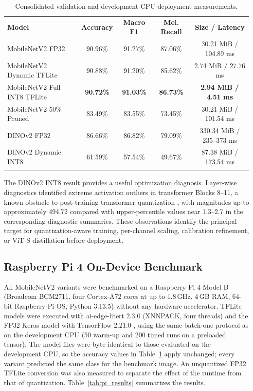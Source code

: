 \documentclass[3p,times,procedia]{elsarticle}
\begin{document}
\begin{table}[htbp]
\centering
\caption{Consolidated validation and development-CPU deployment measurements.}
\label{tab:compression_results}
\begin{tabular*}{\hsize}{@{\extracolsep{\fill}}lcccc}
\toprule
\textbf{Model} & \textbf{Accuracy} & \textbf{Macro F1} & \textbf{Mel. Recall} & \textbf{Size / Latency} \\
\colrule
MobileNetV2 FP32 & 90.96\% & 91.27\% & 87.06\% & 30.21 MiB / 104.89 ms \\
MobileNetV2 Dynamic TFLite & 90.88\% & 91.20\% & 85.62\% & 2.74 MiB / 27.76 ms \\
MobileNetV2 Full INT8 TFLite & \textbf{90.72\%} & \textbf{91.03\%} & \textbf{86.73\%} & \textbf{2.94 MiB / 4.51 ms} \\
MobileNetV2 50\% Pruned & 83.49\% & 83.55\% & 73.45\% & 30.21 MiB / 101.54 ms \\
DINOv2 FP32 & 86.66\% & 86.82\% & 79.09\% & 330.34 MiB / 235--373 ms \\
DINOv2 Dynamic INT8 & 61.59\% & 57.54\% & 49.67\% & 87.38 MiB / 173.54 ms \\
\botrule
\end{tabular*}
\end{table}

The DINOv2 INT8 result provides a useful optimization diagnosis. Layer-wise diagnostics identified extreme activation outliers in transformer Blocks 8--11, a known obstacle to post-training transformer quantization \cite{bondarenko2021,dettmers2022}, with magnitudes up to approximately 494.72 compared with upper-percentile values near 1.3--2.7 in the corresponding diagnostic summaries. These observations identify the principal target for quantization-aware training, per-channel scaling, calibration refinement, or ViT-S distillation before deployment.

\subsection{Raspberry Pi 4 On-Device Benchmark}
\label{sec:pi}

All MobileNetV2 variants were benchmarked on a Raspberry Pi 4 Model B (Broadcom BCM2711, four Cortex-A72 cores at up to 1.8\,GHz, 4\,GB RAM, 64-bit Raspberry Pi OS, Python 3.13.5) without any hardware accelerator. TFLite models were executed with ai-edge-litert 2.3.0 (XNNPACK, four threads) and the FP32 Keras model with TensorFlow 2.21.0 \cite{abadi2016}, using the same batch-one protocol as on the development CPU (50 warm-up and 200 timed runs on a preloaded tensor). The model files were byte-identical to those evaluated on the development CPU, so the accuracy values in Table~\ref{tab:compression_results} apply unchanged; every variant predicted the same class for the benchmark image. An unquantized FP32 TFLite conversion was also measured to separate the effect of the runtime from that of quantization. Table~\ref{tab:pi_results} summarizes the results.
\end{document}
